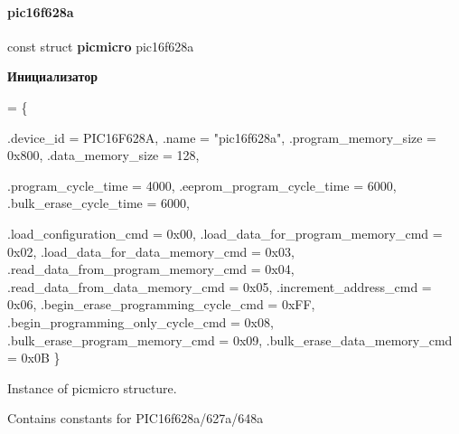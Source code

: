 \paragraph{pic16f628a}
{\footnotesize\ttfamily const struct \textbf{ picmicro} pic16f628a}

{\bfseries Инициализатор}
\begin{DoxyCode}
= \{
    
    .device\_id =                          PIC16F628A,
    .name =                               \textcolor{stringliteral}{"pic16f628a"},
    .program\_memory\_size =                0x800,
    .data\_memory\_size =                   128,
    
    .program\_cycle\_time =                 4000,
    .eeprom\_program\_cycle\_time =          6000,
    .bulk\_erase\_cycle\_time =              6000,
    
    .load\_configuration\_cmd =             0x00,
    .load\_data\_for\_program\_memory\_cmd =   0x02,
    .load\_data\_for\_data\_memory\_cmd =      0x03,
    .read\_data\_from\_program\_memory\_cmd =  0x04,
    .read\_data\_from\_data\_memory\_cmd =     0x05,
    .increment\_address\_cmd =              0x06,
    .begin\_erase\_programming\_cycle\_cmd =  0xFF,
    .begin\_programming\_only\_cycle\_cmd =   0x08,
    .bulk\_erase\_program\_memory\_cmd =      0x09,
    .bulk\_erase\_data\_memory\_cmd =         0x0B
\}
\end{DoxyCode}


Instance of picmicro structure. 

Contains constants for P\+I\+C16f628a/627a/648a 